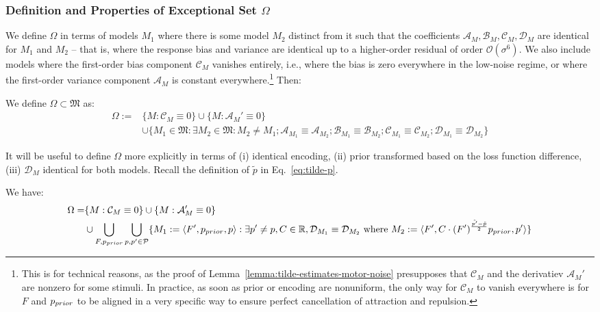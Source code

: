 \subsubsection{Definition and Properties of Exceptional Set $\Omega$}
We define $\Omega$ in terms of models $M_1$ where there is some model $M_2$ distinct from it such that the coefficients $\mathcal{A}_M, \mathcal{B}_M, \mathcal{C}_M, \mathcal{D}_M$ are identical for $M_1$ and $M_2$ -- that is, where the response bias and variance are identical up to a higher-order residual of order $\mathcal{O}(\sigma^6)$.
We also include models where the first-order bias component $\mathcal{C}_M$ vanishes entirely, i.e., where the bias is zero everywhere in the low-noise regime,
 or where the first-order variance component $\mathcal{A}_M$ is constant everywhere.\footnote{This is for technical reasons, as the proof of Lemma~\ref{lemma:tilde-estimates-motor-noise} presupposes that $\mathcal{C}_M$ and the derivatiev $\mathcal{A}_M'$ are nonzero for some stimuli. In practice, as soon as prior or encoding are nonuniform, the only way for $\mathcal{C}_M$ to vanish everywhere is for $F$ and $p_{prior}$ to be aligned in a very specific way to ensure perfect cancellation of attraction and repulsion.}
Then:
\begin{defin}
We define $\Omega \subset \mathfrak{M}$ as:  
\begin{align*}
\Omega := & \{M : \mathcal{C}_M \equiv 0\} \cup \{M : \mathcal{A}_M' \equiv 0\} \\
& \cup  \{M_1 \in \mathfrak{M} : \exists M_2 \in \mathfrak{M} :  M_2 \neq M_1; \mathcal{A}_{M_1} \equiv \mathcal{A}_{M_2}; \mathcal{B}_{M_1} \equiv \mathcal{B}_{M_2}; \mathcal{C}_{M_1} \equiv \mathcal{C}_{M_2}; \mathcal{D}_{M_1} \equiv \mathcal{D}_{M_2}\}
\end{align*}
\end{defin}
It will be useful to define $\Omega$ more explicitly in terms of (i) identical encoding, (ii) prior transformed based on the loss function difference, (iii) $\mathcal{D}_M$ identical for both models.
Recall the definition of $\tilde{p}$ in Eq.~\ref{eq:tilde-p}.
\begin{lemma}
\label{lemma:model_existence}
We have:
\begin{align*}
\Omega = & \{M : \mathcal{C}_M \equiv 0\} \cup \{M : \mathcal{A}_M' \equiv 0\} \\
& \cup \bigcup_{F, p_{prior}} \bigcup_{p,p' \in \mathcal{P}} \{M_1 := \langle F',  p_{prior}, p\rangle : \exists p'\neq p, C \in \mathbb{R}, \mathcal{D}_{M_1} \equiv \mathcal{D}_{M_2} \text{ where } M_2 := \langle F', C \cdot (F')^{\frac{\tilde{p'}-\tilde{p}}{2}} p_{prior}, p'\rangle\}
\end{align*}
\end{lemma}
